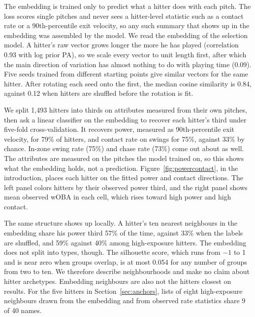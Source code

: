 \documentclass[11pt,letterpaper]{article}
\begin{document}
The embedding is trained only to predict what a hitter does with each pitch. The loss scores single pitches and never sees a hitter-level statistic such as a contact rate or a 90th-percentile exit velocity, so any such summary that shows up in the embedding was assembled by the model. We read the embedding of the selection model. A hitter's raw vector grows longer the more he has played (correlation 0.93 with log prior PA), so we scale every vector to unit length first, after which the main direction of variation has almost nothing to do with playing time (0.09). Five seeds trained from different starting points give similar vectors for the same hitter. After rotating each seed onto the first, the median cosine similarity is 0.84, against 0.12 when hitters are shuffled before the rotation is fit.

We split 1,493 hitters into thirds on attributes measured from their own pitches, then ask a linear classifier on the embedding to recover each hitter's third under five-fold cross-validation. It recovers power, measured as 90th-percentile exit velocity, for 79\% of hitters, and contact rate on swings for 75\%, against 33\% by chance. In-zone swing rate (75\%) and chase rate (73\%) come out about as well. The attributes are measured on the pitches the model trained on, so this shows what the embedding holds, not a prediction. Figure~\ref{fig:powercontact}, in the introduction, places each hitter on the fitted power and contact directions. The left panel colors hitters by their observed power third, and the right panel shows mean observed wOBA in each cell, which rises toward high power and high contact.

The same structure shows up locally. A hitter's ten nearest neighbours in the embedding share his power third 57\% of the time, against 33\% when the labels are shuffled, and 59\% against 40\% among high-exposure hitters. The embedding does not split into types, though. The silhouette score, which runs from $-1$ to 1 and is near zero when groups overlap, is at most 0.054 for any number of groups from two to ten. We therefore describe neighbourhoods and make no claim about hitter archetypes. Embedding neighbours are also not the hitters closest on results. For the five hitters in Section~\ref{sec:anchors}, lists of eight high-exposure neighbours drawn from the embedding and from observed rate statistics share 9 of 40 names.
\end{document}
